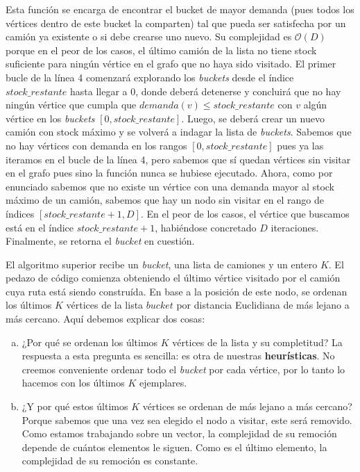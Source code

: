 Esta función se encarga de encontrar el bucket de mayor demanda (pues todos los vértices dentro de este bucket la comparten) tal que pueda ser satisfecha por un camión ya existente o si debe crearse uno nuevo. Su complejidad es $\mathcal{O}(D)$ porque en el peor de los casos, el último camión de la lista no tiene stock suficiente para ningún vértice en el grafo que no haya sido visitado. El primer bucle de la línea 4 comenzará explorando los \textit{buckets} desde el índice $stock\_restante$ hasta llegar a $0$, donde deberá detenerse y concluirá que no hay ningún vértice que cumpla que $demanda(v) \leq stock\_restante$ con $v$ algún vértice en los \textit{buckets} $[0, stock\_restante]$. Luego, se deberá crear un nuevo camión con stock máximo y se volverá a indagar la lista de \textit{buckets}. Sabemos que no hay vértices con demanda en los rangos $[0, stock\_restante]$ pues ya las iteramos en el bucle de la línea 4, pero sabemos que sí quedan vértices sin visitar en el grafo pues sino la función nunca se hubiese ejecutado. Ahora, como por enunciado sabemos que no existe un vértice con una demanda mayor al stock máximo de un camión, sabemos que hay un nodo sin visitar en el rango de índices $[stock\_restante + 1, D]$. En el peor de los casos, el vértice que buscamos está en el índice $stock\_restante + 1$, habiéndose concretado $D$ iteraciones. Finalmente, se retorna el \textit{bucket} en cuestión.



El algoritmo superior recibe un \textit{bucket}, una lista de camiones y un entero $K$. El pedazo de código comienza obteniendo el último vértice visitado por el camión cuya ruta está siendo construída. En base a la posición de este nodo, se ordenan los últimos $K$ vértices de la lista $bucket$ por distancia Euclidiana de más lejano a más cercano. Aquí debemos explicar dos cosas:
\begin{enumerate}[a)]
\item ¿Por qué se ordenan los últimos $K$ vértices de la lista y su completitud? La respuesta a esta pregunta es sencilla: es otra de nuestras \textbf{heurísticas}. No creemos conveniente ordenar todo el \textit{bucket} por cada vértice, por lo tanto lo hacemos con los últimos $K$ ejemplares.
\item ¿Y por qué estos últimos $K$ vértices se ordenan de más lejano a más cercano? Porque sabemos que una vez sea elegido el nodo a visitar, este será removido. Como estamos trabajando sobre un vector, la complejidad de su remoción depende de cuántos elementos le siguen. Como es el último elemento, la complejidad de su remoción es constante.
\end{enumerate}

